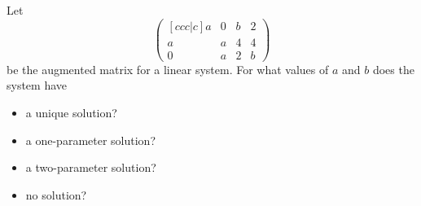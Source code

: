 \begin{problem}
    Let \[\begin{pmatrix}[ccc|c] a & 0 & b & 2 \\ a & a & 4 & 4 \\ 0 & a & 2 & b\end{pmatrix}\] be the augmented matrix for a linear system. For what values of $a$ and $b$ does the system have
    \begin{itemize}
        \item a unique solution?
        \item a one-parameter solution?
        \item a two-parameter solution?
        \item no solution?
    \end{itemize}
\end{problem}
